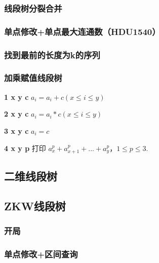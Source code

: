 \documentclass[twoside,a4paper]{article}
\begin{document}
\subsubsection{线段树分裂合并}


\subsubsection{单点修改+单点最大连通数（HDU1540）}


\subsubsection{找到最前的长度为k的序列}


\subsubsection{加乘赋值线段树}
\textbf{1 x y c} $a_{i} = a_{i} + c (x \leq i \leq y)$\par
\textbf{2 x y c} $a_{i} = a_{i} * c (x \leq i \leq y)$\par
\textbf{3 x y c} $a_{i} = c $\par
\textbf{4 x y p} 打印 $a_{x}^{p} + a_{x+1}^{p} + ... +a_{y}^{p}$，$1 \leq p \leq 3$.


\subsection{二维线段树}


\subsection{ZKW线段树}

\subsubsection{开局}


\subsubsection{单点修改+区间查询}

\end{document}
